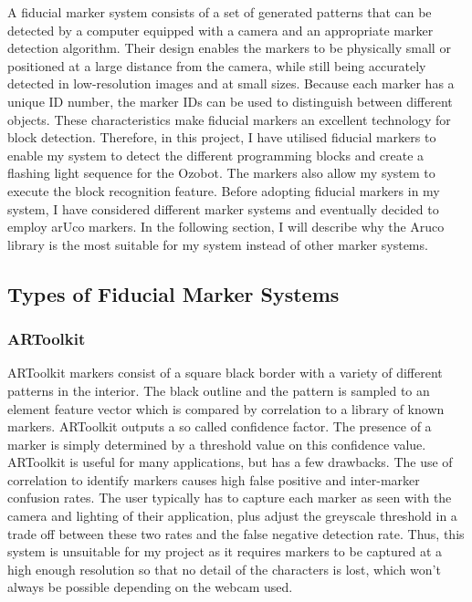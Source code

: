 \documentclass[oneside,%
                    author={Malak Hajji},
                    degree={BSc},
                    title={Designing An Accessible Computational Toolkit For Students},
                  subtitle={With Mixed Visual Abilities}]{dissertation}
\begin{document}
A fiducial marker system consists of a set of generated patterns that can be detected by a computer equipped with a camera and an appropriate marker detection algorithm.  Their design enables the markers to be physically small or positioned at a large distance from the camera, while still being accurately detected in low-resolution images and at small sizes. Because each marker has a unique ID number, the marker IDs can be used to distinguish between different objects. These characteristics make fiducial markers an excellent technology for block detection. 
Therefore, in this project, I have utilised fiducial markers to enable my system to detect the different programming blocks and create a flashing light sequence for the Ozobot. The markers also allow my system to execute the block recognition feature.  Before adopting fiducial markers in my system, I have considered different marker systems and eventually decided to employ arUco markers. In the following section, I will describe why the Aruco library is the most suitable for my system instead of other marker systems.

\subsection{Types of Fiducial Marker Systems}
\subsubsection{ARToolkit}
ARToolkit markers consist of a square black border with a variety of different patterns in the interior. The  black outline and the pattern is sampled to an element feature vector which is compared by correlation to a library of known markers. ARToolkit outputs a so called confidence factor. The presence of a marker is simply determined by a threshold value on this confidence value.
ARToolkit is useful for many applications, but has a few drawbacks. The use of correlation to identify markers causes high false positive and inter-marker confusion rates. The user typically has to capture each marker as seen with the camera and lighting of their application, plus adjust the greyscale threshold in a trade off between these two rates and the false negative detection rate. Thus, this system is unsuitable for my project as it requires markers to be captured at a high enough resolution so that no detail of the characters is lost, which won't always be possible depending on the webcam used.
\end{document}
